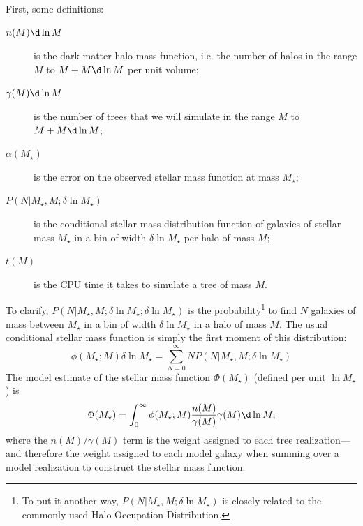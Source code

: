 First, some definitions:
\begin{description}
 \item [$n(M) \d \ln M$] is the dark matter halo mass function, i.e. the number of halos in the range $M$ to $M+M\d\ln  M$ per unit volume;
 \item [$\gamma(M) \d \ln M$] is the number of trees that we will simulate in the range $M$ to $M+M\d \ln M$;
 \item [$\alpha(M_\star)$] is the error on the observed stellar mass function at mass $M_\star$;
 \item [$P(N|M_\star,M;\delta \ln M_\star)$] is the conditional stellar mass distribution function of galaxies of stellar mass $M_\star$ in a bin of width $\delta \ln M_\star$ per halo of mass $M$;
 \item [$t(M)$] is the CPU time it takes to simulate a tree of mass $M$.
\end{description}
To clarify, $P(N|M_\star,M;\delta \ln M_\star;\delta \ln M_\star)$ is the probability\footnote{To put it another way, $P(N|M_\star,M;\delta \ln M_\star)$ is closely related to the commonly used Halo Occupation Distribution.} to find $N$ galaxies of mass between $M_\star$ in a bin of width $\delta \ln M_\star$ in a halo of mass $M$. The usual conditional stellar mass function is simply the first moment of this distribution:
\begin{equation}
 \phi(M_\star;M) \delta \ln M_\star = \sum_{N=0}^\infty N P(N|M_\star,M;\delta \ln M_\star)
 \label{eq:cSMFdefinition}
\end{equation}
The model estimate of the stellar mass function $\Phi(M_\star)$ (defined per unit $\ln M_\star$) is
\begin{equation}
 \Phi(M_\star) = \int_0^\infty \phi(M_\star;M) {n(M) \over \gamma(M)} \gamma(M) \d \ln M,
\end{equation}
where the $n(M)/\gamma(M)$ term is the weight assigned to each tree realization---and therefore the weight assigned to each model galaxy when summing over a model realization to construct the stellar mass function. 

